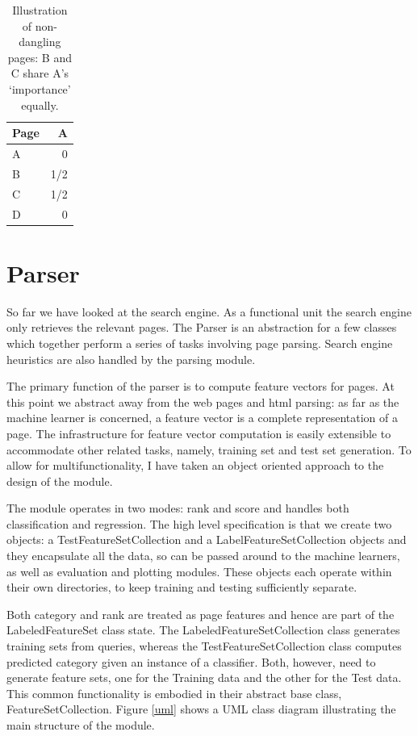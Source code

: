 \documentclass[12pt,twoside,notitlepage]{report}
\begin{document}
\begin{table}
    \begin{center}
      \begin{tabular}{|l|r|}
        \hline
        Page & A \\ \hline
         A &  0  \\ \hline
         B & 1/2 \\ \hline
         C & 1/2 \\ \hline
         D & 0   \\ \hline
      \end{tabular}
      \caption{Illustration of non-dangling pages: B and C share A's `importance' equally.\label{tab}}
  \end{center}
\end{table}

\section{Parser}

So far we have looked at the search engine. As a functional unit the search
engine only retrieves the relevant pages. The Parser is an abstraction for a
few classes which together perform a series of tasks involving page parsing. 
Search engine heuristics are also handled by the parsing module.

The primary function of the parser is to compute feature vectors for pages.
At this point we abstract away from the web pages and html parsing:
as far as the machine learner is concerned, a feature vector is a complete
representation of a page.
The infrastructure for feature vector computation is easily extensible to
accommodate other related tasks, namely, training set and test set generation.
To allow for multifunctionality, I have taken an object oriented approach to the
design of the module.

The module operates in two modes: rank and score and handles both
classification and regression. The high level specification is that we create
two objects: a TestFeatureSetCollection and a LabelFeatureSetCollection
objects and they encapsulate all the data, so can be passed around to the
machine learners, as well as evaluation and plotting modules. These objects
each operate within their own directories, to keep training and testing
sufficiently separate. 

Both category and rank are treated as page features and hence are part of the
LabeledFeatureSet class state.  The LabeledFeatureSetCollection class generates
training sets from queries, whereas the TestFeatureSetCollection class computes
predicted category given an instance of a classifier. Both, however, need to generate
feature sets, one for the Training data and the other for the Test data. This
common functionality is embodied in their abstract base class, FeatureSetCollection.
Figure \ref{uml} shows a UML class diagram illustrating the main structure
of the module.
\end{document}
